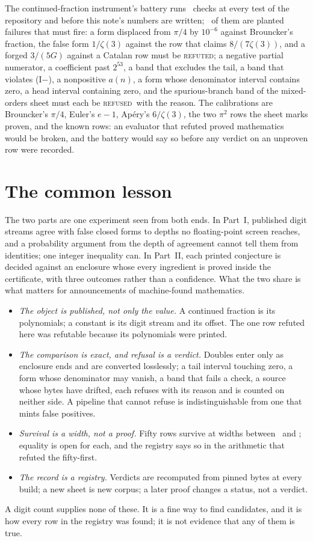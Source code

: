 \documentclass[11pt]{article}
\theoremstyle{definition}
\theoremstyle{plain}
\newcommand{\vR}{\textsc{refuted}}
\newcommand{\vF}{\textsc{refused}}
\begin{document}
The continued-fraction instrument's battery runs \CfBatteryPass\ checks at every test of the repository and before this note's numbers are written; \CfBatteryRed\ of them are planted failures that must fire: a form displaced from $\pi/4$ by $10^{-6}$ against Brouncker's fraction, the false form $1/\zeta(3)$ against the row that claims $8/(7\zeta(3))$, and a forged $3/(5G)$ against a Catalan row must be \vR; a negative partial numerator, a coefficient past $2^{53}$, a band that excludes the tail, a band that violates (I$-$), a nonpositive $a(n)$, a form whose denominator interval contains zero, a head interval containing zero, and the spurious-branch band of the mixed-orders sheet must each be \vF\ with the reason. The calibrations are Brouncker's $\pi/4$, Euler's $e-1$, Ap\'ery's $6/\zeta(3)$, the two $\pi^2$ rows the sheet marks proven, and the known rows: an evaluator that refuted proved mathematics would be broken, and the battery would say so before any verdict on an unproven row were recorded.

\section{The common lesson}

The two parts are one experiment seen from both ends. In Part~I, published digit streams agree with false closed forms to depths no floating-point screen reaches, and a probability argument from the depth of agreement cannot tell them from identities; one integer inequality can. In Part~II, each printed conjecture is decided against an enclosure whose every ingredient is proved inside the certificate, with three outcomes rather than a confidence. What the two share is what matters for announcements of machine-found mathematics.
\begin{itemize}\setlength{\itemsep}{1pt}
\item \emph{The object is published, not only the value.} A continued fraction is its polynomials; a constant is its digit stream and its offset. The one row refuted here was refutable because its polynomials were printed.
\item \emph{The comparison is exact, and refusal is a verdict.} Doubles enter only as enclosure ends and are converted losslessly; a tail interval touching zero, a form whose denominator may vanish, a band that fails a check, a source whose bytes have drifted, each refuses with its reason and is counted on neither side. A pipeline that cannot refuse is indistinguishable from one that mints false positives.
\item \emph{Survival is a width, not a proof.} Fifty rows survive at widths between \RmNarrowest\ and \RmWidest; equality is open for each, and the registry says so in the arithmetic that refuted the fifty-first.
\item \emph{The record is a registry.} Verdicts are recomputed from pinned bytes at every build; a new sheet is new corpus; a later proof changes a status, not a verdict.
\end{itemize}
A digit count supplies none of these. It is a fine way to find candidates, and it is how every row in the registry was found; it is not evidence that any of them is true.
\end{document}
